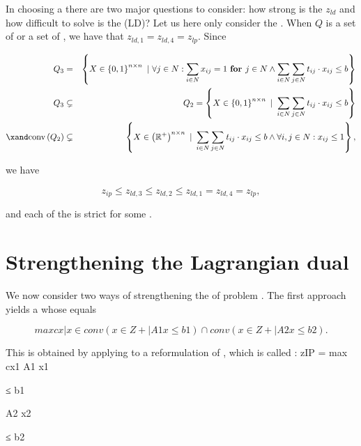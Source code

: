 In choosing a  there are two major questions to consider: how strong is the  $z_{ld}$ and how difficult to solve is the  (LD)? Let us here only consider the . When $Q$ is a set of  or a set of , we have that $z_{ld,1}=z_{ld,4}=z_{lp}$. Since

\begin{eqnarray}
Q_3&=&\condset{X\in\accl{0,1}^{n\times n}}{\forall j\in N:\sumdomain[i]{N}{x_{ij}}=1\xfor j\in N\wedge\sumdomain[i]{N}{\sumdomain[j]{N}{t_{ij}\cdot x_{ij}}}\leq b}\\
Q_3&\subsetneq&Q_2=\condset{X\in\accl{0,1}^{n\times n}}{\sumdomain[i]{N}{\sumdomain[j]{N}{t_{ij}\cdot x_{ij}}}\leq b}\\
\xand\funm{conv}{Q_2}&\subsetneq&\condset{X\in\brak{\RRR^+}^{n\times n}}{\sumdomain[i]{N}{\sumdomain[j]{N}{t_{ij}\cdot x_{ij}}}\leq b\wedge\forall i,j\in N:x_{ij}\leq 1},
\end{eqnarray}

we have

\begin{equation}
z_{ip}\leq z_{ld,3}\leq z_{ld,2}\leq z_{ld,1}=z_{ld,4}=z_{lp},
\end{equation}

and each of the  is strict for some .

\section{Strengthening the Lagrangian dual}

We now consider two ways of strengthening the  of problem . The first approach yields a  whose  equals

\begin{equation}
max{cx| x ∈ conv(x ∈ Z+
| A1 x ≤ b1 ) ∩ conv(x ∈ Z+
| A2 x ≤ b2 )}.
\end{equation}

This  is obtained by applying  to a reformulation of , which is called :
zIP = max cx1
A1 x1

≤ b1

A2 x2

≤ b2

